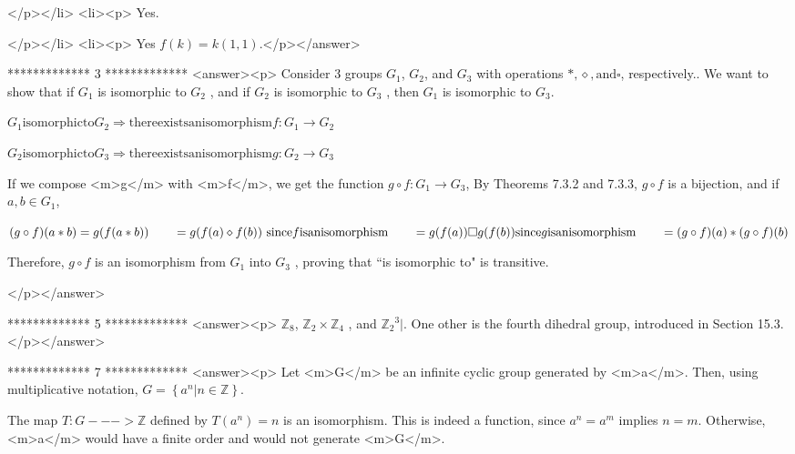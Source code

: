 </p></li>
<li><p> Yes. 

</p></li>
<li><p> Yes   \(f(k) = k(1,1)\).</p></answer>


*************
3
*************
<answer><p>  Consider 3 groups \(G_1\), \(G_2\), and \(G_3\) with operations \(*, \diamond , \text{and} \square\), respectively.. We want to show that if
\(G_1\) is isomorphic to \(G_2\) , and if \(G_2\) is isomorphic to \(G_3\) , then \(G_1\) is isomorphic to \(G_3\).



\(G_1 \text{isomorphic} \text{to} G_2\Rightarrow  \text{there} \text{exists} \text{an} \text{isomorphism} f:G_1\to G_2\) 



\(G_2 \text{isomorphic} \text{to} G_3\Rightarrow  \text{there} \text{exists} \text{an} \text{isomorphism} g:G_2\to G_3\) 



If we compose <m>g</m> with <m>f</m>, we get the function \(g\circ f:G_1\to G_3\),  By Theorems 7.3.2 and 7.3.3, \(g\circ f\) is a bijection,
and if \(a,b\in G_1\),



\((g\circ f)(a*b)=g(f(a*b))\\
\\
\quad \quad =g(f(a)\diamond f(b))\text{  }\text{since} f \text{is} \text{an} \text{isomorphism}\\
\\
\quad \quad =g(f(a))\square g(f(b)) \text{since} g \text{is} \text{an} \text{isomorphism}\\
\\
\quad \quad =(g\circ f)(a) * (g\circ f)(b)\)



Therefore, \(g\circ f\) is an isomorphism from \(G_1\) into \(G_3\) , proving that {``}is isomorphic to$\texttt{"}$ is transitive.

</p></answer>


*************
5
*************
<answer><p>  \(\mathbb{Z}_8\), \(\mathbb{Z}_2\times  \mathbb{Z}_4\) , and \(\mathbb{Z}_2{}^3\)$|$. One other is the fourth dihedral group, introduced in
Section 15.3.</p></answer>


*************
7
*************
<answer><p> Let <m>G</m> be an infinite cyclic group generated by <m>a</m>. Then, using multiplicative notation,  \(G=\left\{\left.a^n\right| n\in
\mathbb{Z}\right\}\).



The map \(T: G ---> \mathbb{Z}\) defined by \(T\left(a^n\right)=n\) is an isomorphism. This is indeed a function, since \(a^n=a^m\) implies \(n =m\).
Otherwise, <m>a</m> would have a finite order and would not generate <m>G</m>.



